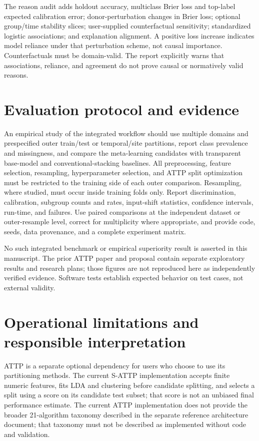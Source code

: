 \documentclass[conference]{IEEEtran}
\begin{document}
The reason audit adds holdout accuracy, multiclass Brier loss and top-label expected calibration error; donor-perturbation changes in Brier loss; optional group/time stability slices; user-supplied counterfactual sensitivity; standardized logistic associations; and explanation alignment. A positive loss increase indicates model reliance under that perturbation scheme, not causal importance. Counterfactuals must be domain-valid. The report explicitly warns that associations, reliance, and agreement do not prove causal or normatively valid reasons.

\section{Evaluation protocol and evidence}
An empirical study of the integrated workflow should use multiple domains and prespecified outer train/test or temporal/site partitions, report class prevalence and missingness, and compare the meta-learning candidates with transparent base-model and conventional-stacking baselines. All preprocessing, feature selection, resampling, hyperparameter selection, and ATTP split optimization must be restricted to the training side of each outer comparison. Resampling, where studied, must occur inside training folds only. Report discrimination, calibration, subgroup counts and rates, input-shift statistics, confidence intervals, run-time, and failures. Use paired comparisons at the independent dataset or outer-resample level, correct for multiplicity where appropriate, and provide code, seeds, data provenance, and a complete experiment matrix.

No such integrated benchmark or empirical superiority result is asserted in this manuscript. The prior ATTP paper and proposal contain separate exploratory results and research plans; those figures are not reproduced here as independently verified evidence. Software tests establish expected behavior on test cases, not external validity.

\section{Operational limitations and responsible interpretation}
ATTP is a separate optional dependency for users who choose to use its partitioning methods. The current S-ATTP implementation accepts finite numeric features, fits LDA and clustering before candidate splitting, and selects a split using a score on its candidate test subset; that score is not an unbiased final performance estimate. The current ATTP implementation does not provide the broader 21-algorithm taxonomy described in the separate reference architecture document; that taxonomy must not be described as implemented without code and validation.
\end{document}
